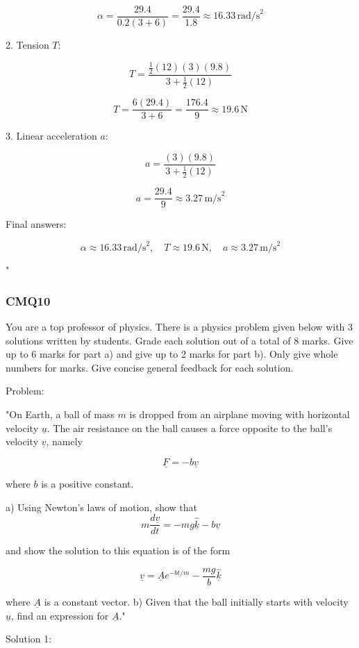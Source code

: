 \[
\alpha = \frac{29.4}{0.2(3 + 6)} = \frac{29.4}{1.8} \approx 16.33\,\text{rad/s}^2
\]

2. Tension $T$:

\[
T = \frac{\frac{1}{2}(12)(3)(9.8)}{3 + \frac{1}{2}(12)}
\]

\[
T = \frac{6(29.4)}{3 + 6} = \frac{176.4}{9} \approx 19.6\,\text{N}
\]

3. Linear acceleration $a$:

\[
a = \frac{(3)(9.8)}{3 + \frac{1}{2}(12)}
\]

\[
a = \frac{29.4}{9} \approx 3.27\,\text{m/s}^2
\]

Final answers:

\[
\boxed{\alpha \approx 16.33\,\text{rad/s}^2, \quad T \approx 19.6\,\text{N}, \quad a \approx 3.27\,\text{m/s}^2}
\]

"

\subsubsection{CMQ10}

You are a top professor of physics. There is a physics problem given below with 3 solutions written by students. Grade each solution out of a total of 8 marks. Give up to 6 marks for part a) and give up to 2 marks for part b). Only give whole numbers for marks. Give concise general feedback for each solution.

Problem:

"On Earth, a ball of mass \( m \) is dropped from an airplane moving with horizontal velocity \( \underline{u} \). The air resistance on the ball causes a force opposite to the ball's velocity \( \underline{v} \), namely 

\[ \underline{F} = - b \underline{v} \] 
    
where \( b \) is a positive constant. 
    
a) Using Newton's laws of motion, show that 
\[
m\frac{d\underline{v}}{dt} = - mg \hat{\underline{k}} - b\underline{v} 
\]
    
and show the solution to this equation is of the form 
    
\[
\underline{v} = \underline{A} e^{-bt/m} - \frac{mg}{b} \hat{\underline{k}} 
\]
    
where \( \underline{A} \) is a constant vector.
    b) Given that the ball initially starts with velocity \( \underline{u} \), find an expression for \( \underline{A} \)."

Solution 1: 

